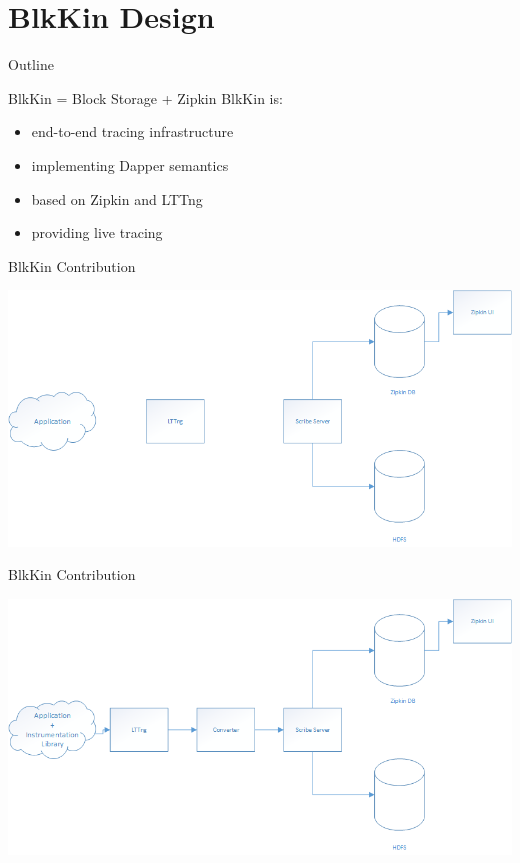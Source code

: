 \section{BlkKin Design}

\begin{frame}[t]{Outline}
\setcounter{tocdepth}{1}
\tableofcontents[currentsection]
\end{frame}

\begin{frame}{BlkKin = Block Storage + Zipkin}
BlkKin is:
\hfill \\
\begin{itemize}
\item end-to-end tracing infrastructure
\item implementing Dapper semantics
\item based on Zipkin and LTTng 
\item providing live tracing
\end{itemize}
\end{frame}

\begin{frame}{BlkKin Contribution}
\begin{center}
\includegraphics[scale=0.45]{images/step1.png}
\end{center}
\end{frame}

\begin{frame}{BlkKin Contribution}
\begin{center}
\includegraphics[scale=0.45]{images/step2.png}
\end{center}
\end{frame}


